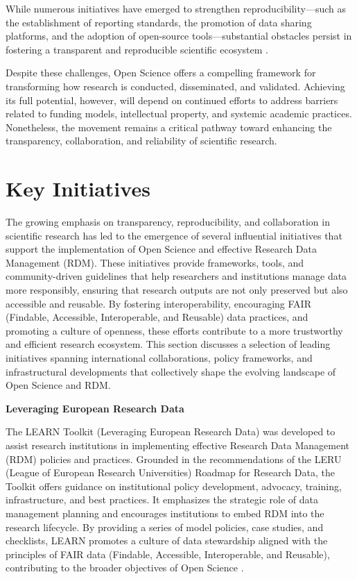 \documentclass[final]{rc-book-2.14}
\begin{document}
While numerous initiatives have emerged to strengthen reproducibility—such as the establishment of reporting standards, the promotion of data sharing platforms, and the adoption of open-source tools—substantial obstacles persist in fostering a transparent and reproducible scientific ecosystem \cite{Nosek2015}.

Despite these challenges, Open Science offers a compelling framework for transforming how research is conducted, disseminated, and validated. Achieving its full potential, however, will depend on continued efforts to address barriers related to funding models, intellectual property, and systemic academic practices. Nonetheless, the movement remains a critical pathway toward enhancing the transparency, collaboration, and reliability of scientific research.


\section{Key Initiatives}
\label{chp:review:sec:key_init}

The growing emphasis on transparency, reproducibility, and collaboration in scientific research has led to the emergence of several influential initiatives that support the implementation of Open Science and effective Research Data Management (RDM). These initiatives provide frameworks, tools, and community-driven guidelines that help researchers and institutions manage data more responsibly, ensuring that research outputs are not only preserved but also accessible and reusable. By fostering interoperability, encouraging FAIR (Findable, Accessible, Interoperable, and Reusable) data practices, and promoting a culture of openness, these efforts contribute to a more trustworthy and efficient research ecosystem. This section discusses a selection of leading initiatives spanning international collaborations, policy frameworks, and infrastructural developments that collectively shape the evolving landscape of Open Science and RDM.

\textbf{Leveraging European Research Data}

The LEARN Toolkit (Leveraging European Research Data) was developed to assist research institutions in implementing effective Research Data Management (RDM) policies and practices. Grounded in the recommendations of the LERU (League of European Research Universities) Roadmap for Research Data, the Toolkit offers guidance on institutional policy development, advocacy, training, infrastructure, and best practices. It emphasizes the strategic role of data management planning and encourages institutions to embed RDM into the research lifecycle. By providing a series of model policies, case studies, and checklists, LEARN promotes a culture of data stewardship aligned with the principles of FAIR data (Findable, Accessible, Interoperable, and Reusable), contributing to the broader objectives of Open Science \cite{learn_2017}.
\end{document}
